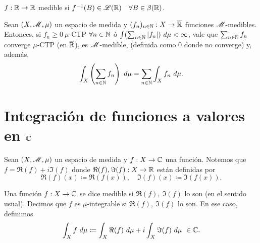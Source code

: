 
\begin{remark}
	$f : \mathbb{R} \to \mathbb{R}$ medible si $f^{-1}(B) \in \mathscr{L}(\mathbb{R}) \quad \forall B \in \beta(\mathbb{R})$.
\end{remark}

\begin{prop}
	Sean $(X, \mathscr{M}, \mu)$ un espacio de medida y $(f_{n})_{n\in\mathbb{N}} : X \to \overline{\mathbb{R}}$ funciones $\mathscr{M}$-medibles. Entonces, si $f_{n} \geq 0 \ \mu$-CTP $\forall n \in \mathbb{N}$ ó $\int(\sum_{n\in\mathbb{N}}^{} |f_{n}|) \ d\mu < \infty$, vale que $\sum_{n\in\mathbb{N}}^{} f_{n}$ converge $\mu$-CTP (en $\overline{\mathbb{R}}$), es $\mathscr{M}$-medible, (definida como $0$ donde no converge) y, además,
	\[ \int_{X} \left(\sum_{n\in\mathbb{N}}^{} f_{n}\right) \ d\mu = \sum_{n\in\mathbb{N}}^{} \int_{X} f_{n} \ d\mu. \]
\end{prop}

\section{Integración de funciones a valores en $\mathbb{C}$}

Sean $(X, \mathscr{M}, \mu)$ un espacio de medida y $f : X \to \mathbb{C}$ una función. Notemos que $f = \Re(f) + i\Im(f)$ donde $\Re(f), \Im(f) : X \to \mathbb{R}$ están definidas por
\[ \Re(f)(x) \coloneq \Re(f(x)), \quad \Im(f)(x) \coloneq \Im(f(x)). \]

\begin{definition}
	Una función $f : X \to \mathbb{C}$ se dice medible si $\Re(f),\ \Im(f)$ lo son (en el sentido usual). Decimos que $f$ es $\mu$-integrable si $\Re(f),\ \Im(f)$ lo son. En ese caso, definimos
	\[ \int_{X} f \ d\mu \coloneq \int_{X} \Re(f) \ d\mu + i \int_{X} \Im(f) \ d\mu \ \in \C. \]
\end{definition}

